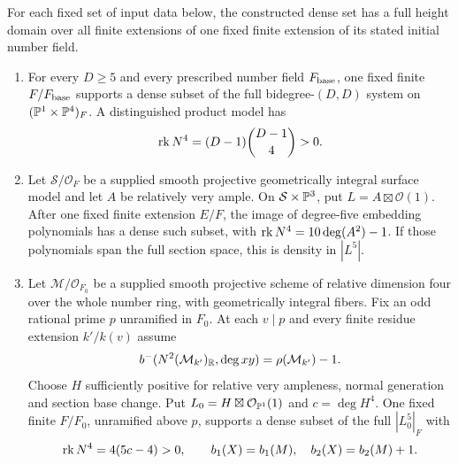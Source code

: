 \begin{theorem}\label{thm:dense-products}
For each fixed set of input data below, the constructed dense set
has a full height domain over all finite extensions of one fixed
finite extension of its stated initial number field.
\begin{enumerate}[label=\textup{(\roman*)}]
\item For every $D\geq5$ and every prescribed number field
$F_{\rm base}$, one fixed finite $F/F_{\rm base}$ supports a
dense subset of the full bidegree-$(D,D)$ system on
$(\mathbb P^1\times\mathbb P^4)_F$. A distinguished product model has
\[
 \operatorname{rk} N^4=(D-1)\binom{D-1}{4}>0.
\]
\item Let $\mathcal S/\mathcal O_F$ be a supplied smooth
projective geometrically integral surface model and let $A$ be
relatively very ample. On $\mathcal S\times\mathbb P^3$, put
$L=A\boxtimes\mathcal O(1)$. After one fixed finite extension
$E/F$, the image of degree-five embedding polynomials has a
dense such subset, with
$\operatorname{rk} N^4=10\deg(A^2)-1$. If those polynomials span the full
section space, this is density in $|L^5|$.
\item Let $\mathcal M/\mathcal O_{F_0}$ be a supplied smooth
projective scheme of relative dimension four over the whole number
ring, with geometrically integral fibers. Fix an odd rational prime $p$ unramified
in $F_0$. At each $v\mid p$ and every finite residue extension
$k'/k(v)$ assume
\begin{equation}\label{eq:host-signature}
 b^-(N^2(\mathcal M_{k'})_\mathbb R,\deg xy)
                  =\rho(\mathcal M_{k'})-1.
\end{equation}
Choose $H$ sufficiently positive for relative very ampleness,
normal generation and section base change. Put
$L_0=H\boxtimes\mathcal O_{\mathbb P^1}(1)$ and $c=\deg H^4$.
One fixed finite $F/F_0$, unramified above $p$, supports a dense
subset of the full $|L_0^5|_F$ with
\[
 \operatorname{rk} N^4=4(5c-4)>0,\qquad
 b_1(X)=b_1(M),\quad b_2(X)=b_2(M)+1.
\]
\end{enumerate}
\end{theorem}

